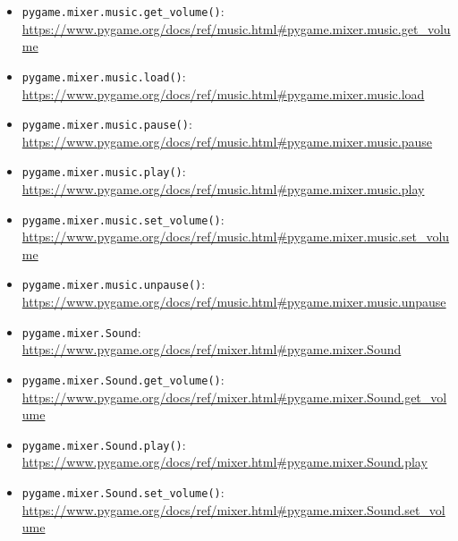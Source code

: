 \begin{itemize}
	\item \texttt{pygame.mixer.music.get\_volume()}:
\\ \url{https://www.pygame.org/docs/ref/music.html#pygame.mixer.music.get_volume}

    \item \texttt{pygame.mixer.music.load()}:
\\ \url{https://www.pygame.org/docs/ref/music.html#pygame.mixer.music.load}

	\item \texttt{pygame.mixer.music.pause()}:
\\ \url{https://www.pygame.org/docs/ref/music.html#pygame.mixer.music.pause}

	\item \texttt{pygame.mixer.music.play()}:
\\ \url{https://www.pygame.org/docs/ref/music.html#pygame.mixer.music.play}

	\item \texttt{pygame.mixer.music.set\_volume()}:
\\ \url{https://www.pygame.org/docs/ref/music.html#pygame.mixer.music.set_volume}

	\item \texttt{pygame.mixer.music.unpause()}:
\\ \url{https://www.pygame.org/docs/ref/music.html#pygame.mixer.music.unpause}

	\item \texttt{pygame.mixer.Sound}:
\\ \url{https://www.pygame.org/docs/ref/mixer.html#pygame.mixer.Sound}

	\item \texttt{pygame.mixer.Sound.get\_volume()}:
\\ \url{https://www.pygame.org/docs/ref/mixer.html#pygame.mixer.Sound.get_volume}

	\item \texttt{pygame.mixer.Sound.play()}:
\\ \url{https://www.pygame.org/docs/ref/mixer.html#pygame.mixer.Sound.play}

	\item \texttt{pygame.mixer.Sound.set\_volume()}:
\\ \url{https://www.pygame.org/docs/ref/mixer.html#pygame.mixer.Sound.set_volume}

\end{itemize}
